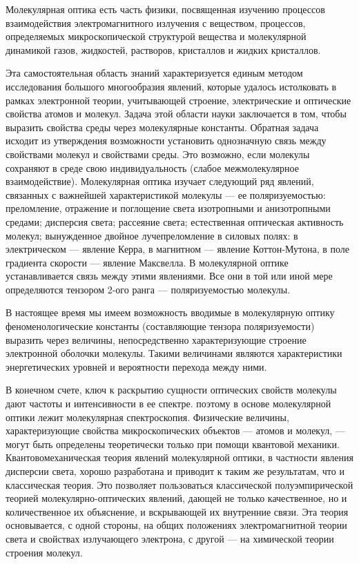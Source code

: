﻿
\thispagestyle{empty}

Молекулярная оптика есть часть физики, посвященная изучению
процессов взаимодействия электромагнитного излучения с веществом,
процессов, определяемых микроскопической структурой вещества и
молекулярной динамикой газов, жидкостей, растворов,
кристаллов и жидких кристаллов.

Эта самостоятельная область знаний характеризуется единым методом
исследования большого многообразия явлений, которые удалось
истолковать в рамках электронной теории, учитывающей строение,
электрические и оптические свойства атомов и молекул. Задача этой
области науки заключается в том, чтобы выразить свойства среды
через молекулярные константы. Обратная задача исходит из
утверждения возможности установить однозначную связь между
свойствами молекул и свойствами среды. Это возможно, если
молекулы сохраняют в среде свою индивидуальность (слабое
межмолекулярное взаимодействие). Молекулярная оптика изучает
следующий ряд явлений, связанных с важнейшей характеристикой
молекулы --- ее поляризуемостью: преломление, отражение и
поглощение света изотропными и анизотропными средами;
дисперсия света; рассеяние света; естественная оптическая
активность молекул; вынужденное двойное лучепреломление в силовых
полях: в электрическом --- явление Керра, в магнитном --- явление
Коттон-Мутона, в поле градиента скорости --- явление Максвелла. В
молекулярной оптике устанавливается связь между этими явлениями.
Все они в той или иной мере определяются тензором 2-ого ранга ---
поляризуемостью молекулы.

В настоящее время мы имеем возможность вводимые в молекулярную
оптику феноменологические константы (составляющие тензора
поляризуемости) выразить через величины, непосредственно
характеризующие строение электронной оболочки молекулы. Такими
величинами являются характеристики энергетических уровней и
вероятности перехода между ними.

В конечном счете, ключ к раскрытию сущности оптических свойств
молекулы дают частоты и интенсивности в ее спектре. поэтому в
основе молекулярной оптики лежит молекулярная спектроскопия.
Физические величины, характеризующие свойства микроскопических
объектов --- атомов и молекул, --- могут быть определены
теоретически только при помощи квантовой механики.
Квантовомеханическая теория явлений молекулярной оптики, в
частности явления дисперсии света, хорошо разработана и приводит
к таким же результатам, что и классическая теория. Это позволяет
пользоваться классической полуэмпирической теорией
молекулярно-оптических явлений, дающей не только качественное, но
и количественное их объяснение, и вскрывающей их внутренние
связи. Эта теория основывается, с одной стороны, на общих
положениях электромагнитной теории света и свойствах
излучающего электрона, с другой --- на химической теории строения
молекул.

